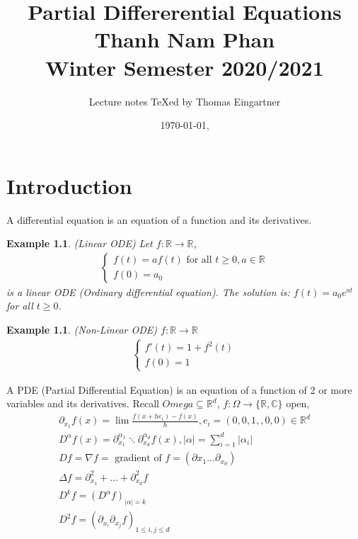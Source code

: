 \documentclass{report}
\title{Partial Differerential Equations \\ Thanh Nam Phan \\ Winter Semester 2020/2021}
\author{Lecture notes \TeX ed by Thomas Eingartner}
\date{\today, \currenttime}
\theoremstyle{tommy}
\newtheorem{eg}[defn]{Example}
\begin{document}
\maketitle
\tableofcontents
\newpage



\chapter{Introduction}

A differential equation is an equation of a function and its derivatives. 

\begin{eg} (Linear ODE)
  Let \(f: \mathbb{R} \to \mathbb{R}\),
  \begin{align*}
    \begin{cases}
      f(t) = a f(t) \text{ for all } t \ge 0, a \in \mathbb{R} \\
      f(0) = a_0
    \end{cases}
  \end{align*}
  is a linear ODE (Ordinary differential equation). The solution is: \(f(t) = a_0 e^{at}\) for all \(t \ge 0\).
\end{eg}

\begin{eg} (Non-Linear ODE) \(f: \mathbb{R} \to \mathbb{R}\)
  \begin{align*}
    \begin{cases}
      f'(t) = 1 + f^2(t) \\
      f(0) = 1
    \end{cases}
  \end{align*}
\end{eg}

A PDE (Partial Differential Equation) is an equation of a function of 2 or more variables and its derivatives. Recall \(Omega \subseteq \mathbb{R}^d\), \(f: \Omega \to \{\mathbb{R}, \mathbb{C}\}\) open, 
\begin{align*}
  \partial_{x_1} f(x) = \lim \frac{f(x + he_i) - f(x)}{h}, e_i = (0,0, 1,, 0, 0) \in \mathbb{R}^d \\
  D^\alpha f(x) = \partial_{x_1}^{\alpha_1} \ddots \partial_{x_d}^{\alpha_d} f(x), |\alpha| = \sum_{i=1}^d |\alpha_i| \\
  Df = \nabla f = \text{ gradient of } f = (\partial{x_1} \dots \partial_{x_d}) \\
  \Delta f = \partial_{x_1}^2 + \dots + \partial^2_{x_d} f \\
  D^kf = (D^\alpha f)_{|\alpha| = k} \\
  D^2 f = (\partial_{x_i} \partial_{x_j} f)_{1 \le i, j \le d}
\end{align*}
\end{document}
